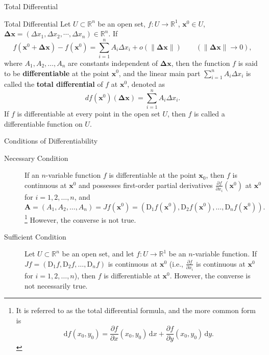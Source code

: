 \documentclass[11pt]{../../TexTemplate/elegantbook}
\begin{document}
\begin{leftbarTitle}{Total Differential}\end{leftbarTitle}
\begin{definition}{Total Differential}
    Let \(U\subset \mathbb{R}^n\) be an open set, \(f: U\to \mathbb{R}^{1}\), \(\mathbf{x}^{0}\in U\),
    \(\mathbf{\Delta x}=\left( \Delta x_{1},\Delta x_{2},\cdots,\Delta x_{n} \right) \in \mathbb{R}^{n}\). If
    \[
    f(\mathbf{x}^{0} + \mathbf{\Delta x}) - f(\mathbf{x}^{0}) = 
    \sum_{i=1}^n A_{i} \Delta x_{i} + o(\|\mathbf{\Delta x}\|) \qquad (\|\mathbf{\Delta x}\| \to 0),
    \]
    where \(A_{1}, A_{2}, \dots, A_{n}\) are constants independent of \(\mathbf{\Delta x}\), 
    then the function \(f\) is said to be \textbf{differentiable} at the point \(\mathbf{x}^{0}\), 
    and the linear main part \(\sum_{i=1}^n A_{i} \Delta x_{i}\) is called the \textbf{total differential} 
    of \(f\) at \(\mathbf{x}^{0}\), 
    denoted as
    \[
    df(\mathbf{x}^{0})(\mathbf{\Delta x}) = \sum_{i=1}^n A_{i} \Delta x_{i}.
    \]
    If \(f\) is differentiable at every point in the open set \(U\), 
    then \(f\) is called a differentiable function on \(U\).    
\end{definition}

\begin{theorem}{Conditions of Differentiability}
    \begin{description}
        \item[Necessary Condition] If an \(n\)-variable function \(f\) is differentiable at the point \(\mathbf{x}_{0}\), 
        then \(f\) is continuous at \(\mathbf{x}^{0}\) and 
        possesses first-order partial derivatives \(\frac{\partial f}{\partial x_{i}}(\mathbf{x}^{0})\) 
        at \(\mathbf{x}^{0}\) for \(i = 1, 2, \dots, n\), and
        \[
        \mathbf{A} = \left( A_{1}, A_{2}, \dots, A_{n} \right)  = Jf(\mathbf{x}^{0}) = 
        \left(\mathrm{D}_{1}f(\mathbf{x}^{0}), \mathrm{D}_{2}f(\mathbf{x}^{0}), \dots, \mathrm{D}_{n}f(\mathbf{x}^{0}) \right).
        \]\footnote{
            It is referred to as the total differential formula, and the more common form is
            \[
                \mathrm{d}f(x_{0},y_{0})=
                \frac{\partial f}{\partial x}(x_{0},y_{0})\,\mathrm{d}x+\frac{\partial f}{\partial y}(x_{0},y_{0})\,\mathrm{d}y.
            \]
        }
        However, the converse is not true.
        \item[Sufficient Condition] Let \(U \subset \mathbb{R}^n\) be an open set, 
        and let \(f: U \to \mathbb{R}^1\) be an \(n\)-variable function. 
        If \(Jf = \left( \mathrm{D}_{1}f, \mathrm{D}_{2}f, \dots, \mathrm{D}_{n}f \right)\) 
        is continuous at \(\mathbf{x}^{0}\) 
        (i.e., \(\frac{\partial f}{\partial x_{i}}\) is continuous at \(\mathbf{x}^{0}\) for \(i = 1, 2, \dots, n\)), 
        then \(f\) is differentiable at \(\mathbf{x}^{0}\).
        However, the converse is not necessarily true.
    \end{description}    
\end{theorem}
\end{document}
